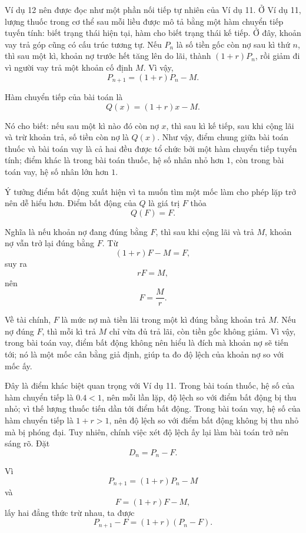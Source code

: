   {
    \vspace{.5\baselineskip}
    Ví dụ 12 nên được đọc như một phần nối tiếp tự nhiên của Ví dụ 11. Ở Ví dụ 11, lượng thuốc trong cơ thể sau mỗi liều được mô tả bằng một hàm chuyển tiếp tuyến tính: biết trạng thái hiện tại, hàm cho biết trạng thái kế tiếp. Ở đây, khoản vay trả góp cũng có cấu trúc tương tự. Nếu $P_n$ là số tiền gốc còn nợ sau kì thứ $n$, thì sau một kì, khoản nợ trước hết tăng lên do lãi, thành $(1+r)P_n$, rồi giảm đi vì người vay trả một khoản cố định $M$. Vì vậy,
    $$
    P_{n+1}=(1+r)P_n-M.
    $$

    Hàm chuyển tiếp của bài toán là
    $$
    Q(x)=(1+r)x-M.
    $$

    Nó cho biết: nếu sau một kì nào đó còn nợ $x$, thì sau kì kế tiếp, sau khi cộng lãi và trừ khoản trả, số tiền còn nợ là $Q(x)$. Như vậy, điểm chung giữa bài toán thuốc và bài toán vay là cả hai đều được tổ chức bởi một hàm chuyển tiếp tuyến tính; điểm khác là trong bài toán thuốc, hệ số nhân nhỏ hơn $1$, còn trong bài toán vay, hệ số nhân lớn hơn $1$.

    Ý tưởng điểm bất động xuất hiện vì ta muốn tìm một mốc làm cho phép lặp trở nên dễ hiểu hơn. Điểm bất động của $Q$ là giá trị $F$ thỏa
    $$
    Q(F)=F.
    $$

    Nghĩa là nếu khoản nợ đang đúng bằng $F$, thì sau khi cộng lãi và trả $M$, khoản nợ vẫn trở lại đúng bằng $F$. Từ
    $$
    (1+r)F-M=F,
    $$
    suy ra
    $$
    rF=M,
    $$
    nên
    $$
    F=\frac{M}{r}.
    $$

    Về tài chính, $F$ là mức nợ mà tiền lãi trong một kì đúng bằng khoản trả $M$. Nếu nợ đúng $F$, thì mỗi kì trả $M$ chỉ vừa đủ trả lãi, còn tiền gốc không giảm. Vì vậy, trong bài toán vay, điểm bất động không nên hiểu là đích mà khoản nợ sẽ tiến tới; nó là một mốc cân bằng giả định, giúp ta đo độ lệch của khoản nợ so với mốc ấy.

    Đây là điểm khác biệt quan trọng với Ví dụ 11. Trong bài toán thuốc, hệ số của hàm chuyển tiếp là $0.4<1$, nên mỗi lần lặp, độ lệch so với điểm bất động bị thu nhỏ; vì thế lượng thuốc tiến dần tới điểm bất động. Trong bài toán vay, hệ số của hàm chuyển tiếp là $1+r>1$, nên độ lệch so với điểm bất động không bị thu nhỏ mà bị phóng đại. Tuy nhiên, chính việc xét độ lệch ấy lại làm bài toán trở nên sáng rõ. Đặt
    $$
    D_n=P_n-F.
    $$

    Vì
    $$
    P_{n+1}=(1+r)P_n-M
    $$
    và
    $$
    F=(1+r)F-M,
    $$
    lấy hai đẳng thức trừ nhau, ta được
    $$
    P_{n+1}-F=(1+r)(P_n-F).
    $$

}
